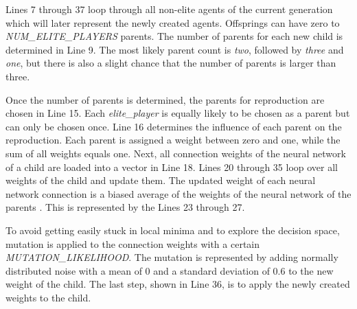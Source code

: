Lines 7 through 37 loop through all non-elite agents of the current generation which will later represent the newly created agents. Offsprings can have zero to \textit{NUM\_ELITE\_PLAYERS} parents. The number of parents for each new child is determined in Line 9. The most likely parent count is \textit{two}, followed by \textit{three} and \textit{one}, but there is also a slight chance that the number of parents is larger than three.\par
Once the number of parents is determined, the parents for reproduction are chosen in Line 15. Each \textit{elite\_player} is equally likely to be chosen as a parent but can only be chosen once. Line 16 determines the influence of each parent on the reproduction. Each parent is assigned a weight between zero and one, while the sum of all weights equals one. Next, all connection weights of the neural network of a child are loaded into a vector in Line 18. Lines 20 through 35 loop over all weights of the child and update them. The updated weight of each neural network connection is a biased average of the weights of the neural network of the parents \cite{evolutionary_methods}. This is represented by the Lines 23 through 27.\par
To avoid getting easily stuck in local minima and to explore the decision space, mutation is applied to the connection weights with a certain \textit{MUTATION\_LIKELIHOOD}. The mutation is represented by adding normally distributed noise with a mean of 0 and a standard deviation of 0.6 to the new weight of the child. The last step, shown in Line 36, is to apply the newly created weights to the child.

